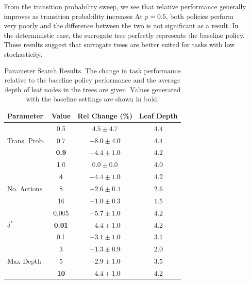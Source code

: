 \documentclass[letterpaper]{article} %
\begin{document}
From the transition probability sweep, we see that relative performance generally improves as transition probability increases
At $p=0.5$, both policies perform very poorly and the difference between the two is not significant as a result.
In the deterministic case, the surrogate tree perfectly represents the baseline policy. 
These results suggest that surrogate trees are better suited for tasks with low stochasticity. 
\begin{table}[t]
    \centering
    \begin{tabular}{@{}l c c c@{}}
        \toprule
        Parameter & Value & Rel Change (\%) & Leaf Depth \\
        \midrule
        \multirow[c]{3}{*}{Trans. Prob.} & 0.5 & $4.5 \pm 4.7$ & $4.4$ \\ 
        & 0.7 & $-8.0 \pm 4.0$ & $4.4$ \\ 
        & \textbf{0.9} & $\mathbf{-4.4 \pm 1.0}$ & $\mathbf{4.2}$ \\ 
        & 1.0 & $0.0 \pm 0.0$ & $4.0$ \\ 
        \midrule
        \multirow[c]{3}{*}{No. Actions} & \textbf{4} & $\mathbf{-4.4 \pm 1.0}$ & $\mathbf{4.2}$ \\ 
        & 8 & $-2.6 \pm 0.4$ & $2.6$ \\ 
        & 16 & $-1.0 \pm 0.3$ & $1.5$ \\ 
        \midrule
        \multirow[c]{3}{*}{$\delta^*$} & 0.005 & $-5.7 \pm 1.0$ & $4.2$ \\ 
        & \textbf{0.01} & $\mathbf{-4.4 \pm 1.0}$ & $\mathbf{4.2}$ \\ 
        & 0.1 & $-3.1 \pm 1.0$ & $3.1$ \\ 
        \midrule
        \multirow[c]{3}{*}{Max Depth} & 3 & $-1.3 \pm 0.9$ & $2.0$ \\ 
        & 5 & $-2.9 \pm 1.0$ & $3.5$ \\ 
        & \textbf{10} & $\mathbf{-4.4 \pm 1.0}$ & $\mathbf{4.2}$ \\ 
        \bottomrule
    \end{tabular}
    \caption{Parameter Search Results. The change in task performance relative to the baseline policy performance and the average depth of leaf nodes in the trees are given. Values generated with the baseline settings are shown in bold.}
    \label{tab: grid results}
\end{table}
\end{document}
